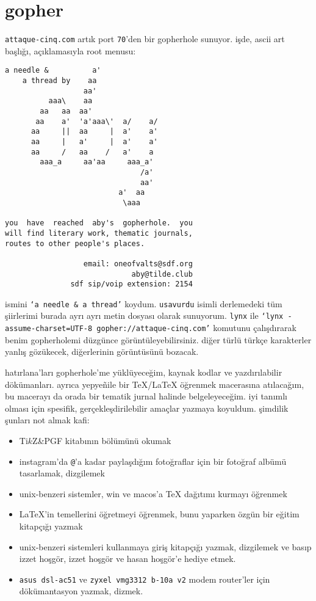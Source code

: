 \documentclass[a4paper, twocolumn, openright]{memoir}
\begin{document}
\section{gopher}
\texttt{attaque-cinq.com} artık port \texttt{70}'den bir gopherhole
sunuyor. işde, ascii art başlığı, açıklamasıyla root menusu:
\begin{verbatim}
a needle &          a'
    a thread by    aa
                  aa'
          aaa\    aa
        aa   aa  aa'
       aa    a'  'a'aaa\'  a/    a/
      aa     ||  aa     |  a'    a'
      aa     |   a'     |  a'    a'
      aa     /   aa    /   a'    a
        aaa_a     aa'aa     aaa_a'
                               /a'
                               aa'
                          a'  aa
                           \aaa

you  have  reached  aby's  gopherhole.  you
will find literary work, thematic journals,
routes to other people's places.

                  email: oneofvalts@sdf.org
                             aby@tilde.club
               sdf sip/voip extension: 2154
\end{verbatim}
ismini \texttt{`a needle \& a thread'} koydum. \texttt{usavurdu} isimli
derlemedeki tüm şiirlerimi burada ayrı ayrı metin dosyası olarak
sunuyorum. \texttt{lynx} ile \texttt{`lynx -assume-charset=UTF-8
gopher://attaque-cinq.com'} komutunu çalışdırarak benim gopherholemi
düzgünce görüntüleyebilirsiniz. diğer türlü türkçe karakterler yanlış
gözükecek, diğerlerinin görüntüsünü bozacak.

hatırlana'ları gopherhole'me yüklüyeceğim, kaynak kodlar ve
yazdırılabilir dökümanları. ayrıca yepye\~nile bir \TeX/\LaTeX{} öğrenmek
macerasına atılacağım, bu macerayı da orada bir tematik jurnal halinde
belgeleyeceğim. iyi tanımlı olması için spesifik, gerçekleşdirilebilir
amaçlar yazmaya koyuldum. şimdilik şunları not almak kafi:
\begin{itemize}
  \item Ti$k$Z\&PGF kitabının  bölümünü
    okumak
  \item instagram'da \texttt{@}'a kadar paylaşdığım fotoğraflar için bir
    fotoğraf albümü tasarlamak, dizgilemek
  \item unix-benzeri sistemler, win ve macos'a \TeX{} dağıtımı kurmayı
    öğrenmek
  \item \LaTeX'in temellerini öğretmeyi öğrenmek, bunu yaparken özgün bir
    eğitim kitapçığı yazmak
  \item unix-benzeri sistemleri kullanmaya giriş kitapçığı yazmak,
    dizgilemek ve basıp izzet hoşgör, izzet hoşgör ve hasan hoşgör'e
    hediye etmek.
  \item \texttt{asus dsl-ac51} ve \texttt{zyxel vmg3312 b-10a v2} modem
    router'ler için dökümantasyon yazmak, dizmek.
\end{itemize}
\end{document}
